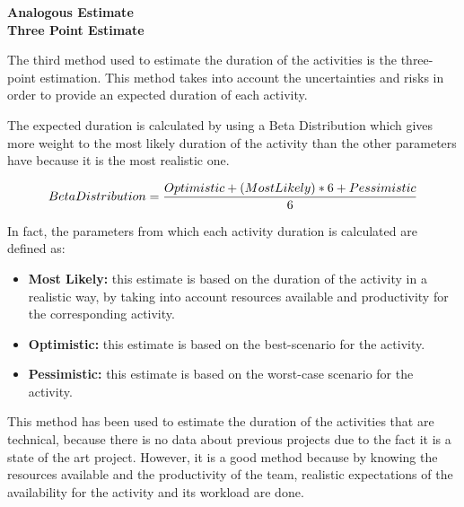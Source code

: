 \textbf{Analogous Estimate}\\

\textbf{Three Point Estimate}

The third method used to estimate the duration of the activities is the three-point estimation. This method takes into account the uncertainties and risks in order to provide an expected duration of each activity. 

The expected duration is calculated by using a Beta Distribution which gives more weight to the most likely duration of the activity than the other parameters have because it is the most realistic one. 

\begin{equation}
\centering
\notag Beta Distribution=\frac{Optimistic + (Most Likely) * 6 + Pessimistic}{6}
\end{equation}

In fact, the parameters from which each activity duration is calculated are defined as: 

\begin{itemize}

\item \textbf{Most Likely:} this estimate is based on the duration of the activity in a realistic way, by taking into account resources available and productivity for the corresponding activity. 

\item \textbf{Optimistic:} this estimate is based on the best-scenario for the activity. 

\item \textbf{Pessimistic:} this estimate is based on the worst-case scenario for the activity. 

\end{itemize}

This method has been used to estimate the duration of the activities that are technical, because there is no data about previous projects due to the fact it is a state of the art project. However, it is a good method because by knowing the resources available and the productivity of the team, realistic expectations of the availability for the activity and its workload are done. \\



